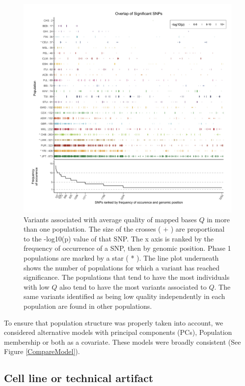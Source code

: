 \documentclass[custompaper]{MBE}%
\begin{document}
\begin{figure}
\includegraphics[width=\hsize,keepaspectratio]{./Figures/SNPOverlap6.jpg}

\caption{Variants associated with average quality of mapped bases $Q$ in more than one population.
The size of the crosses ( + ) are proportional to the -log10(p) value of that SNP.
The x axis is ranked by the frequency of occurrence of a SNP, then by genomic position.
Phase 1 populations are marked by a star ( * ).
The line plot underneath shows the number of populations for which a variant has reached significance.
The populations that tend to have the most individuals with low $Q$ also tend to have the most variants associated to $Q$. 
The same variants identified as being low quality independently in each population are found in other populations. }
  \label{OverLap}
\end{figure}
To ensure that population structure was properly taken into account, we considered alternative models with principal components (PCs), Population membership or both as a covariate. 
These models were broadly consistent (See Figure \ref{CompareModel}).

\subsection{Cell line or technical artifact}
\end{document}
